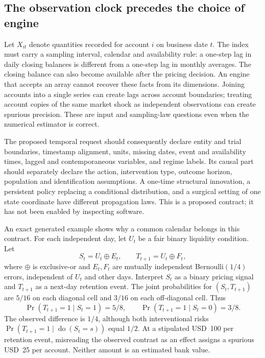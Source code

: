 \subsection{The observation clock precedes the choice of engine}

Let $X_{it}$ denote quantities recorded for account $i$ on business date $t$.
The index must carry a sampling interval, calendar and availability rule:
a one-step lag in daily closing balances is different from a one-step lag in
monthly averages. The closing balance can also become available after the
pricing decision. An engine that accepts an array cannot recover these facts
from its dimensions. Joining accounts into a single series can create lags
across account boundaries; treating account copies of the same market shock
as independent observations can create spurious precision. These are input
and sampling-law questions even when the numerical estimator is correct.

The proposed temporal request should consequently declare entity and trial
boundaries, timestamp alignment, units, missing dates, event and availability
times, lagged and contemporaneous variables, and regime labels. Its causal
part should separately declare the action, intervention type, outcome horizon,
population and identification assumptions. A one-time structural innovation,
a persistent policy replacing a conditional distribution, and a surgical
setting of one state coordinate have different propagation laws.
This is a proposed contract; it has not been enabled by inspecting software.
\citep{exec17_temporal_contract}

An exact generated example shows why a common calendar belongs in this
contract. For each independent day, let $U_t$ be a fair binary liquidity
condition. Let
\[
 S_t=U_t\mathbin{\oplus}E_t,\qquad
 T_{t+1}=U_t\mathbin{\oplus}F_t,
\]
where $\oplus$ is exclusive-or and $E_t,F_t$ are mutually independent
Bernoulli$(1/4)$ errors, independent of $U_t$ and other days. Interpret $S_t$
as a binary pricing signal and $T_{t+1}$ as a next-day retention event.
The joint probabilities for $(S_t,T_{t+1})$ are $5/16$ on each diagonal
cell and $3/16$ on each off-diagonal cell. Thus
\[
 \Pr(T_{t+1}=1\mid S_t=1)=5/8,\qquad
 \Pr(T_{t+1}=1\mid S_t=0)=3/8.
\]
The observed difference is $1/4$, although both interventional risks
$\Pr(T_{t+1}=1\mid\operatorname{do}(S_t=s))$ equal $1/2$.
At a stipulated USD~100 per retention event, misreading the observed contrast
as an effect assigns a spurious USD~25 per account. Neither amount is an
estimated bank value.
\citep{exec17_temporal_oracle}

